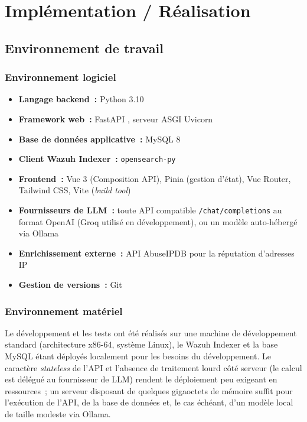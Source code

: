 \chapter{Implémentation / Réalisation}
\label{chap:implementation}

\section{Environnement de travail}

\subsection{Environnement logiciel}

\begin{itemize}
  \item \textbf{Langage backend~:} Python 3.10
  \item \textbf{Framework web~:} FastAPI \cite{fastapi_docs}, serveur
        ASGI Uvicorn
  \item \textbf{Base de données applicative~:} MySQL 8
  \item \textbf{Client Wazuh Indexer~:} \texttt{opensearch-py}
  \item \textbf{Frontend~:} Vue 3 \cite{vuejs_docs} (Composition API),
        Pinia (gestion d'état), Vue Router, Tailwind CSS, Vite
        (\textit{build tool})
  \item \textbf{Fournisseurs de LLM~:} toute API compatible
        \texttt{/chat/completions} au format OpenAI
        \cite{openai_toolcalling} (Groq utilisé en développement), ou un
        modèle auto-hébergé via Ollama \cite{ollama_docs}
  \item \textbf{Enrichissement externe~:} API AbuseIPDB \cite{abuseipdb}
        pour la réputation d'adresses IP
  \item \textbf{Gestion de versions~:} Git
\end{itemize}

\subsection{Environnement matériel}

Le développement et les tests ont été réalisés sur une machine de
développement standard (architecture x86-64, système Linux), le Wazuh
Indexer et la base MySQL étant déployés localement pour les besoins du
développement. Le caractère \textit{stateless} de l'API et l'absence de
traitement lourd côté serveur (le calcul est délégué au fournisseur de LLM)
rendent le déploiement peu exigeant en ressources~; un serveur disposant de
quelques gigaoctets de mémoire suffit pour l'exécution de l'API, de la base
de données et, le cas échéant, d'un modèle local de taille modeste via
Ollama.

